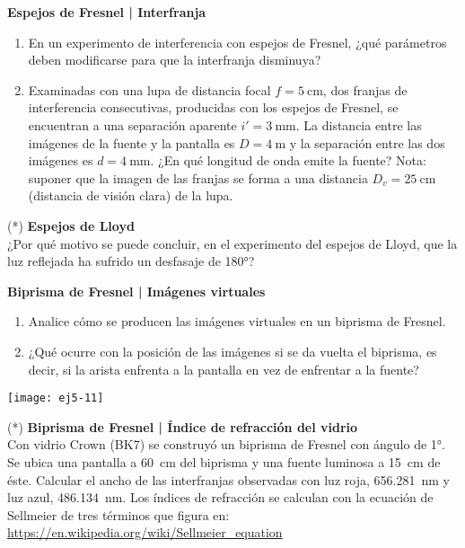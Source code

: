 \item 
\textbf{Espejos de Fresnel | Interfranja}
\begin{enumerate}
	\item En un experimento de interferencia con espejos de Fresnel, ¿qué parámetros deben modificarse para que la interfranja disminuya?
	\item Examinadas con una lupa de distancia focal $f = \SI{5}{\centi\metre}$, dos franjas de interferencia consecutivas, producidas con los espejos de Fresnel, se encuentran a una separación aparente $i' = \SI{3}{\milli\metre}$.
	La distancia entre las imágenes de la fuente y la pantalla es $D = \SI{4}{\metre}$ y la separación entre las dos imágenes es $d = \SI{4}{\milli\metre}$.
	¿En qué longitud de onda emite la fuente?
	Nota: suponer que la imagen de las franjas se forma a una distancia $D_v = \SI{25}{\centi\metre}$ (distancia de visión clara) de la lupa.
\end{enumerate}



\item (*) \textbf{Espejos de Lloyd}\\
¿Por qué motivo se puede concluir, en el experimento del espejos de Lloyd, que la luz reflejada ha sufrido un desfasaje de \ang{180;;}?




\item 
\textbf{Biprisma de Fresnel | Imágenes virtuales}\\
\begin{minipage}[t][3cm]{0.6\textwidth}
\begin{enumerate}
	\item Analice cómo se producen las imágenes virtuales en un biprisma de Fresnel.
	\item ¿Qué ocurre con la posición de las imágenes si se da vuelta el biprisma, es decir, si la arista enfrenta a la pantalla en vez de enfrentar a la fuente?
\end{enumerate}
\end{minipage}
\begin{minipage}[c][1cm][t]{0.35\textwidth}
	\texttt{[image: ej5-11]}
\end{minipage}



\item 
(*) \textbf{Biprisma de Fresnel | Índice de refracción del vidrio}\\
Con vidrio Crown (BK7) se construyó un biprisma de Fresnel con ángulo de \ang{1;;}.
Se ubica una pantalla a \SI{60}{\centi\metre} del biprisma y una fuente luminosa a \SI{15}{\centi\metre} de éste.
Calcular el ancho de las interfranjas observadas con luz roja, \SI{656.281}{\nano\metre} y luz azul, \SI{486.134}{\nano\metre}.
Los índices de refracción se calculan con la ecuación de Sellmeier de tres términos que figura en: \url{https://en.wikipedia.org/wiki/Sellmeier_equation} 



